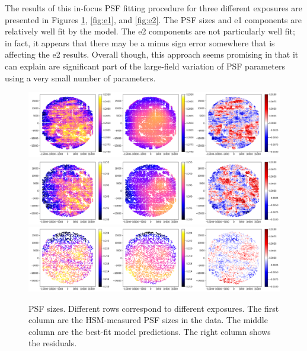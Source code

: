 \documentclass{article}
\begin{document}
The results of this in-focus PSF fitting procedure for three different exposures
are presented in Figures \ref{fig:size}, \ref{fig:e1}, and \ref{fig:e2}.  The
PSF sizes and e1 components are relatively well fit by the model.  The e2
components are not particularly well fit; in fact, it appears that there may be
a minus sign error somewhere that is affecting the e2 results.  Overall though,
this approach seems promising in that it can explain are significant part of the
large-field variation of PSF parameters using a very small number of parameters.

\begin{figure}
    \includegraphics[width=\textwidth]{r_69008.png}
    \includegraphics[width=\textwidth]{r_69014.png}
    \includegraphics[width=\textwidth]{r_69026.png}

    \caption{PSF sizes.  Different rows correspond to different exposures.  The
    first column are the HSM-measured PSF sizes in the data.  The middle column
    are the best-fit model predictions.  The right column shows the residuals.}

    \label{fig:size}
\end{figure}
\end{document}
